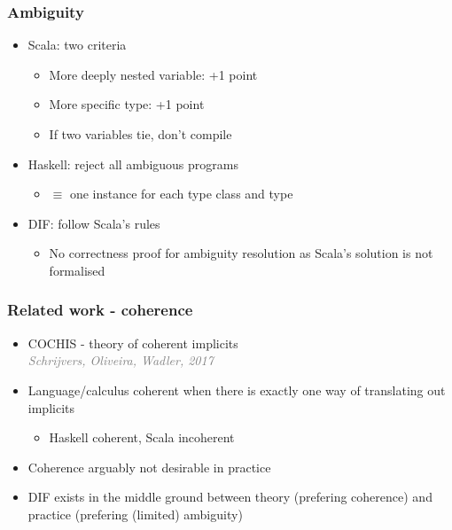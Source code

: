 \begin{frame}
    \frametitle{Ambiguity}
    \begin{itemize}
        \pause \item Scala: two criteria
        \begin{itemize}
            \pause \item More deeply nested variable: +1 point
            \pause \item More specific type: +1 point
            \pause \item If two variables tie, don't compile
        \end{itemize}
        \pause \item Haskell: reject all ambiguous programs
        \begin{itemize}
            \pause \item $\equiv$ one instance for each type class and type
        \end{itemize}
        \pause \item DIF: follow Scala's rules
        \begin{itemize}
            \pause \item No correctness proof for ambiguity resolution as
                Scala's solution is not formalised
        \end{itemize}
    \end{itemize}
\end{frame}

\begin{frame}
    \frametitle{Related work - coherence}
    \begin{itemize}
        \pause \item COCHIS - theory of coherent implicits \\
            \textcolor{grey}{\emph{Schrijvers, Oliveira, Wadler, 2017}}
        \pause \item Language/calculus coherent when there is exactly one way of
            translating out implicits
        \begin{itemize}
            \pause \item Haskell coherent, Scala incoherent
        \end{itemize}
        \pause \item Coherence arguably not desirable in practice
        \pause \item DIF exists in the middle ground between theory (prefering
            coherence) and practice (prefering (limited) ambiguity)
    \end{itemize}
\end{frame}

